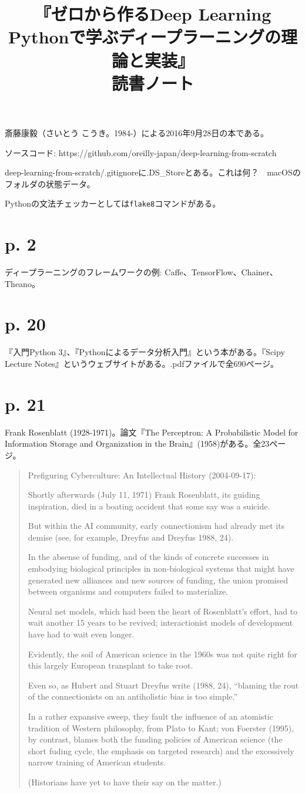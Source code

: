 \documentclass[uplatex,dvipdfmx]{jsarticle} \usepackage{amsmath,amssymb,bm}
\title{『ゼロから作るDeep Learning\\Pythonで学ぶディープラーニングの理論と実装』\\読書ノート} \author{} \date{}
\begin{document}
\maketitle
斎藤康毅（さいとう こうき。1984-）による2016年9月28日の本である。

ソースコード: https://github.com/oreilly-japan/deep-learning-from-scratch

deep-learning-from-scratch/.gitignoreに.DS\_Storeとある。これは何？　macOSのフォルダの状態データ。

Pythonの文法チェッカーとしては{\tt flake8}コマンドがある。
\section*{p. 2}
ディープラーニングのフレームワークの例: Caffe、TensorFlow、Chainer、Theano。
\section*{p. 20}
『入門Python 3』、『Pythonによるデータ分析入門』という本がある。『Scipy Lecture Notes』というウェブサイトがある。.pdfファイルで全690ページ。
\section*{p. 21}
Frank Rosenblatt (1928-1971)。論文『The Perceptron: A Probabilistic Model for Information Storage and Organization in the Brain』(1958)がある。全23ページ。
\begin{quotation}
Prefiguring Cyberculture: An Intellectual History (2004-09-17):

Shortly afterwards (July 11, 1971) Frank Rosenblatt, its guiding inspiration, died in a boating accident that some say was a suicide.

But within the AI community, early connectionism had already met its demise (see, for example, Dreyfus and Dreyfus 1988, 24).

In the absense of funding, and of the kinds of concrete successes in embodying biological principles in non-biological systems that might have generated new alliances and new sources of funding, the union promised between organisms and computers failed to materialize.

Neural net models, which had been the heart of Rosenblatt's effort, had to wait another 15 years to be revived; interactionist models of development have had to wait even longer.

Evidently, the soil of American science in the 1960s was not quite right for this largely European transplant to take root.

Even so, as Hubert and Stuart Dreyfus write (1988, 24), ``blaming the rout of the connectionists on an antiholistic bias is too simple.''

In a rather expansive sweep, they fault the influence of an atomistic tradition of Western philosophy, from Plato to Kant; von Foerster (1995), by contrast, blames both the funding policies of American science (the short fuding cycle, the emphasis on targeted research) and the excessively narrow training of American students.

(Historians have yet to have their say on the matter.)
\end{quotation}
\end{document}
